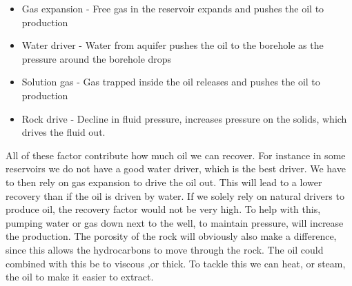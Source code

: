 \documentclass[DIV=calc, paper=a4, fontsize=11pt, twocolumn]{scrartcl}	 %
\begin{document}
\begin{itemize}
\item Gas expansion - Free gas in the reservoir expands and pushes the oil to production
\item Water driver - Water from aquifer pushes the oil to the borehole as the pressure around the borehole drops
\item Solution gas - Gas trapped inside the oil releases and pushes the oil to production
\item Rock drive - Decline in fluid pressure, increases pressure on the solids, which drives the fluid out.
\end{itemize}
All of these factor contribute how much oil we can recover.
For instance in some reservoirs we do not have a good water driver, which is the best driver. We have to then rely on gas expansion to drive the oil out. This will lead to a lower recovery than if the oil is driven by water. 
\newline
If we solely rely on natural drivers to produce oil, the recovery factor would not be very high. To help with this, pumping water or gas down next to the well, to maintain pressure, will increase the production. 
\newline
The porosity of the rock will obviously also make a difference, since this allows the hydrocarbons to move through the rock. The oil could combined with this be to viscous ,or thick. To tackle this we can heat, or steam, the oil to make it easier to extract.
\end{document}
